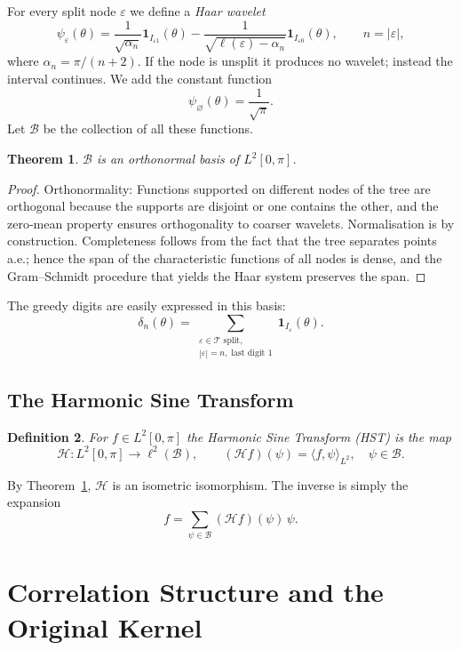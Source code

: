 \documentclass[11pt,a4paper]{article}
\newtheorem{theorem}{Theorem}[section]
\newtheorem{definition}[theorem]{Definition}
\theoremstyle{remark}
\begin{document}
For every split node \(\varepsilon\) we define a \emph{Haar wavelet}
\[
\psi_\varepsilon(\theta) =
\frac{1}{\sqrt{\alpha_n}}\mathbf{1}_{I_{\varepsilon1}}(\theta)
- \frac{1}{\sqrt{\ell(\varepsilon)-\alpha_n}}\mathbf{1}_{I_{\varepsilon0}}(\theta),
\qquad n = |\varepsilon|,
\tag{5}
\]
where \(\alpha_n = \pi/(n+2)\). If the node is unsplit it produces no wavelet; instead the interval continues. We add the constant function
\[
\psi_\varnothing(\theta) = \frac{1}{\sqrt{\pi}} .
\]
Let \(\mathcal{B}\) be the collection of all these functions.

\begin{theorem}\label{thm:haar}
\(\mathcal{B}\) is an orthonormal basis of \(L^2[0,\pi]\).
\end{theorem}
\begin{proof}
Orthonormality: Functions supported on different nodes of the tree are orthogonal because the supports are disjoint or one contains the other, and the zero‑mean property ensures orthogonality to coarser wavelets. Normalisation is by construction. Completeness follows from the fact that the tree separates points a.e.; hence the span of the characteristic functions of all nodes is dense, and the Gram–Schmidt procedure that yields the Haar system preserves the span.
\end{proof}

The greedy digits are easily expressed in this basis:
\[
\delta_n(\theta) = \sum_{\substack{\varepsilon\in\mathcal{T}\text{ split},\\ |\varepsilon|=n,\; \text{last digit }1}} \mathbf{1}_{I_\varepsilon}(\theta).
\tag{6}
\]

\subsection{The Harmonic Sine Transform}

\begin{definition}
For \(f\in L^2[0,\pi]\) the \emph{Harmonic Sine Transform} (HST) is the map
\[
\mathcal{H}: L^2[0,\pi] \longrightarrow \ell^2(\mathcal{B}),\qquad
(\mathcal{H}f)(\psi) = \langle f,\psi\rangle_{L^2},\quad \psi\in\mathcal{B}.
\]
\end{definition}
By Theorem~\ref{thm:haar}, \(\mathcal{H}\) is an isometric isomorphism. The inverse is simply the expansion
\[
f = \sum_{\psi\in\mathcal{B}} (\mathcal{H}f)(\psi)\,\psi .
\]

\section{Correlation Structure and the Original Kernel}
\end{document}
